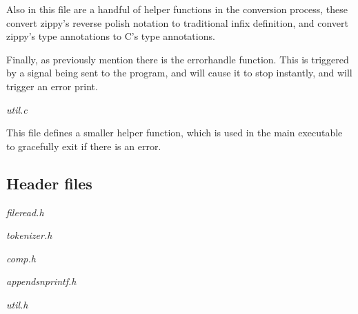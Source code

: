 \documentclass[a4paper,12pt]{article}
\begin{document}
{Also in this file are a handful of helper functions in the conversion process, these convert zippy's reverse polish notation to traditional 
infix definition, and convert zippy's type annotations to C's type annotations.

Finally, as previously mention there is the errorhandle function. This is triggered by a signal being sent to the program, and will cause 
it to stop instantly, and will trigger an error print.


\textit{util.c}

This file defines a smaller helper function, which is used in the main executable to gracefully exit if there is an error.

\subsection{Header files}

\textit{fileread.h}

\textit{tokenizer.h}

\textit{comp.h}

\textit{appendsnprintf.h}

\textit{util.h}


}
\end{document}

